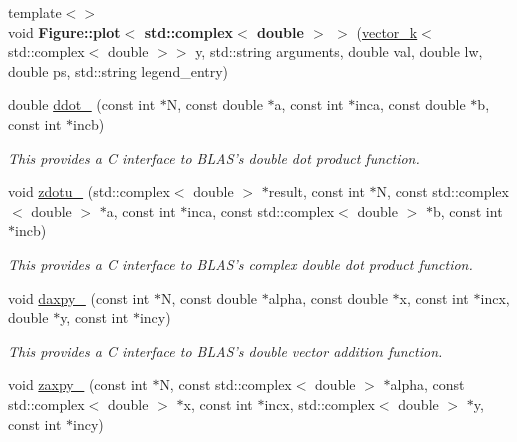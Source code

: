 \begin{DoxyCompactItemize}
\item 
\hypertarget{namespacekeycpp_ae195fde461203ab0b36e03c693f9d346}{{\footnotesize template$<$$>$ }\\void {\bfseries Figure\-::plot$<$ std\-::complex$<$ double $>$ $>$} (\hyperlink{classkeycpp_1_1vector__k}{vector\-\_\-k}$<$ std\-::complex$<$ double $>$$>$ y, std\-::string arguments, double val, double lw, double ps, std\-::string legend\-\_\-entry)}\label{namespacekeycpp_ae195fde461203ab0b36e03c693f9d346}

\item 
\hypertarget{namespacekeycpp_a55e50932cc54f92bdd7e38c6438f4f1f}{double \hyperlink{namespacekeycpp_a55e50932cc54f92bdd7e38c6438f4f1f}{ddot\-\_\-} (const int $\ast$N, const double $\ast$a, const int $\ast$inca, const double $\ast$b, const int $\ast$incb)}\label{namespacekeycpp_a55e50932cc54f92bdd7e38c6438f4f1f}

\begin{DoxyCompactList}\small\item\em This provides a C interface to B\-L\-A\-S's double dot product function. \end{DoxyCompactList}\item 
\hypertarget{namespacekeycpp_a2ce99b4fe4a13b9c70ada81761eb0ca2}{void \hyperlink{namespacekeycpp_a2ce99b4fe4a13b9c70ada81761eb0ca2}{zdotu\-\_\-} (std\-::complex$<$ double $>$ $\ast$result, const int $\ast$N, const std\-::complex$<$ double $>$ $\ast$a, const int $\ast$inca, const std\-::complex$<$ double $>$ $\ast$b, const int $\ast$incb)}\label{namespacekeycpp_a2ce99b4fe4a13b9c70ada81761eb0ca2}

\begin{DoxyCompactList}\small\item\em This provides a C interface to B\-L\-A\-S's complex double dot product function. \end{DoxyCompactList}\item 
\hypertarget{namespacekeycpp_ae99c5b242a21ba683701ccb6ab6534b1}{void \hyperlink{namespacekeycpp_ae99c5b242a21ba683701ccb6ab6534b1}{daxpy\-\_\-} (const int $\ast$N, const double $\ast$alpha, const double $\ast$x, const int $\ast$incx, double $\ast$y, const int $\ast$incy)}\label{namespacekeycpp_ae99c5b242a21ba683701ccb6ab6534b1}

\begin{DoxyCompactList}\small\item\em This provides a C interface to B\-L\-A\-S's double vector addition function. \end{DoxyCompactList}\item 
\hypertarget{namespacekeycpp_a6460fa334239dde761d8f737b9438fed}{void \hyperlink{namespacekeycpp_a6460fa334239dde761d8f737b9438fed}{zaxpy\-\_\-} (const int $\ast$N, const std\-::complex$<$ double $>$ $\ast$alpha, const std\-::complex$<$ double $>$ $\ast$x, const int $\ast$incx, std\-::complex$<$ double $>$ $\ast$y, const int $\ast$incy)}\label{namespacekeycpp_a6460fa334239dde761d8f737b9438fed}


\end{DoxyCompactItemize}
